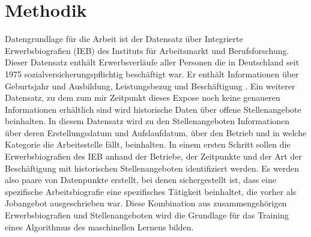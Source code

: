 \documentclass[
    11pt,
    a4paper,
    egregdoesnotlikesansseriftitles,
    toc=chapterentrywithdots,
    oneside,openright,
    titlepage,
    parskip=half,
    headings=normal,  %
    listof=totoc,
    bibliography=totoc,
    index=totoc,
    captions=tableheading,  %
    chapterprefix,
    listof=flat,
    final
]{scrbook}
\begin{document}
{\let\clearpage\relax \chapter{Methodik}\label{Methodik}}
Datengrundlage für die Arbeit ist der Datensatz über Integrierte Erwerbsbiografien (IEB) des Instituts für Arbeitsmarkt und Berufsforschung. Dieser Datensatz enthält Erwerbsverläufe aller Personen die in Deutschland seit 1975 sozialversicherungspflichtig beschäftigt war. Er enthält Informationen über Geburtsjahr und Ausbildung, Leistungsbezug und Beschäftigung \cite{ieb}.
Ein weiterer Datensatz, zu dem zum mir Zeitpunkt dieses Expose noch keine genaueren Informationen erhältlich sind wird historische Daten über offene Stellenangebote beinhalten. In diesem Datensatz wird zu den Stellenangeboten Informationen über deren Erstellungsdatum und Aufslaufdatum, über den Betrieb und in welche Kategorie die Arbeitsstelle fällt, beinhalten. In einem ersten Schritt sollen die Erwerbsbiografien des IEB anhand der Betriebe, der Zeitpunkte und der Art der Beschäftigung mit historischen Stellenangeboten identifiziert werden. Es werden also paare von Datenpunkte erstellt, bei denen sichergestellt ist, dass eine spezifische Arbeitsbiografie eine spezifisches Tätigkeit beinhaltet, die vorher als Jobangebot ausgeschrieben war. Diese Kombination aus zusammengehörigen Erwerbsbiografien und Stellenangeboten wird die Grundlage für das Training eines Algorithmus des maschinellen Lernens bilden.
\end{document}
